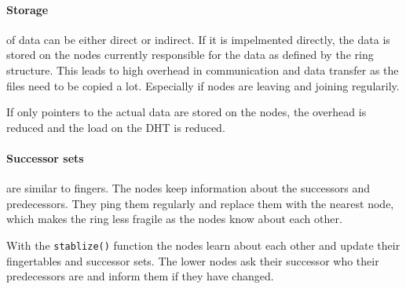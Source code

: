 	\paragraph{Storage} %
	\label{par:storage}
	of data can be either direct or indirect.
	If it is impelmented directly,
	the data is stored on the nodes currently responsible for the data as defined by the ring structure.
	This leads to high overhead in communication
	and data transfer as the files need to be copied a lot.
	Especially if nodes are leaving and joining regularily.

	If only pointers to the actual data are stored on the nodes,
	the overhead is reduced and the load on the DHT is reduced.

	\paragraph{Successor sets} %
	\label{par:successor_sets}
	are similar to fingers.
	The nodes keep information about the successors and predecessors.
	They ping them regularly and replace them with the nearest node,
	which makes the ring less fragile as the nodes know about each other.

	With the \texttt{stablize()} function the nodes learn about each other
	and update their fingertables and successor sets.
	The lower nodes ask their successor who their predecessors are
	and inform them if they have changed.

